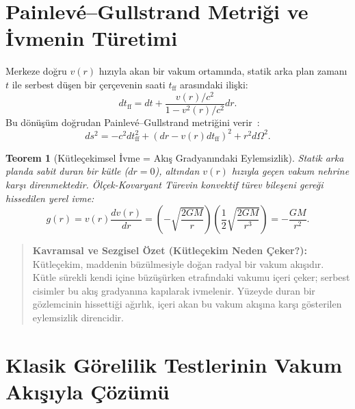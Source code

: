 \documentclass[11pt,a4paper]{article}
\newtheorem{theorem}{Teorem}[section]
\begin{document}
\section{Painlev\'e--Gullstrand Metriği ve İvmenin Türetimi}
\label{sec:ivme}

Merkeze doğru $v(r)$ hızıyla akan bir vakum ortamında, statik arka plan zamanı $t$ ile serbest düşen bir çerçevenin saati $t_{\mathrm{ff}}$ arasındaki ilişki:
\begin{equation}
    dt_{\mathrm{ff}} = dt + \frac{v(r)/c^2}{1 - v^2(r)/c^2} dr.
    \label{eq:donusum}
\end{equation}
Bu dönüşüm doğrudan Painlev\'e--Gullstrand metriğini verir~\cite{painleve1921,gullstrand1922}:
\begin{equation}
    ds^2 = -c^2 dt_{\mathrm{ff}}^2 + \left( dr - v(r) dt_{\mathrm{ff}} \right)^2 + r^2 d\Omega^2.
    \label{eq:pg_metrik}
\end{equation}

\begin{theorem}[Kütleçekimsel İvme = Akış Gradyanındaki Eylemsizlik]
    \label{thm:ivme_eylemsizlik_p1}
    Statik arka planda sabit duran bir kütle ($dr = 0$), altından $v(r)$ hızıyla geçen vakum nehrine karşı direnmektedir. Ölçek-Kovaryant Türevin konvektif türev bileşeni gereği hissedilen yerel ivme:
    \begin{equation}
        g(r) = v(r) \frac{dv(r)}{dr} = \left(-\sqrt{\frac{2GM}{r}}\right) \left(\frac{1}{2}\sqrt{\frac{2GM}{r^3}}\right) = -\frac{GM}{r^2}.
        \label{eq:ivme_ispat}
    \end{equation}
\end{theorem}

\begin{quote}
    \small
    \textbf{Kavramsal ve Sezgisel Özet (Kütleçekim Neden Çeker?):} \\
    Kütleçekim, maddenin büzülmesiyle doğan radyal bir vakum akışıdır. Kütle sürekli kendi içine büzüşürken etrafındaki vakumu içeri çeker; serbest cisimler bu akış gradyanına kapılarak ivmelenir. Yüzeyde duran bir gözlemcinin hissettiği ağırlık, içeri akan bu vakum akışına karşı gösterilen eylemsizlik direncidir.
\end{quote}

\section{Klasik Görelilik Testlerinin Vakum Akışıyla Çözümü}
\label{sec:testler}
\end{document}
